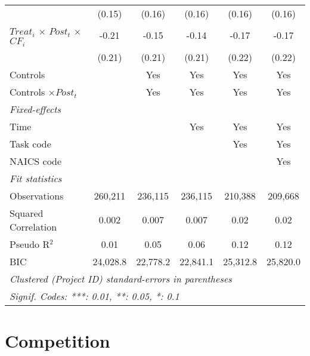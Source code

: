 \documentclass[
]{article}
\begin{document}
\begin{table}[htbp]
\begin{tabular}{lccccc}
                                                    & (0.15)        & (0.16)        & (0.16)       & (0.16)       & (0.16)\\
      $Treat_i$ $\times$ $Post_t$ $\times$ $CF_i$ & -0.21         & -0.15         & -0.14        & -0.17        & -0.17\\
                                                    & (0.21)        & (0.21)        & (0.21)       & (0.22)       & (0.22)\\
      Controls                                      &               & Yes           & Yes          & Yes          & Yes\\
      Controls $\times Post_t$                     &               & Yes           & Yes          & Yes          & Yes\\
      \midrule \emph{Fixed-effects} &   &   &   &   &  \\
      Time                                          &               &               & Yes          & Yes          & Yes\\
      Task code                                     &               &               &              & Yes          & Yes\\
      NAICS code                                    &               &               &              &              & Yes\\
      \midrule \emph{Fit statistics} &   &   &   &   &  \\
      Observations                                  & 260,211       & 236,115       & 236,115      & 210,388      & 209,668\\
      Squared Correlation                           & 0.002         & 0.007         & 0.007        & 0.02         & 0.02\\
      Pseudo R$^2$                                  & 0.01          & 0.05          & 0.06         & 0.12         & 0.12\\
      BIC                                           & 24,028.8      & 22,778.2      & 22,841.1     & 25,312.8     & 25,820.0\\
      \midrule\midrule\multicolumn{6}{l}{\emph{Clustered (Project ID) standard-errors in parentheses}}\\
      \multicolumn{6}{l}{\emph{Signif. Codes: ***: 0.01, **: 0.05, *: 0.1}}\\
   \end{tabular}
\end{table}

\hypertarget{competition}{%
\section{Competition}\label{competition}}
\end{document}

